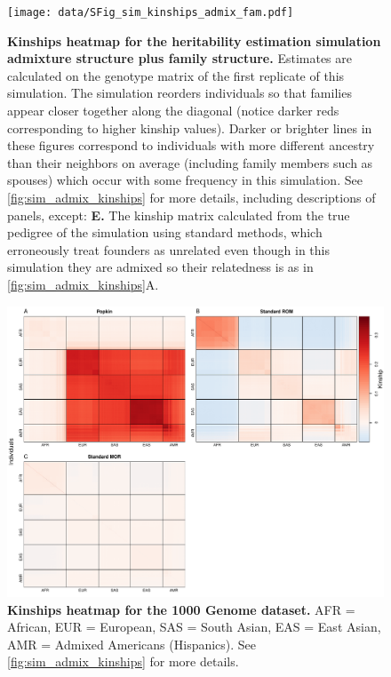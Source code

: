 \documentclass[11pt]{article}
\begin{document}
\begin{figure}[bp!]
  \centering
  \texttt{[image: data/SFig\_sim\_kinships\_admix\_fam.pdf]}
  \caption{
    {\bf Kinships heatmap for the heritability estimation simulation admixture structure plus family structure.}
    Estimates are calculated on the genotype matrix of the first replicate of this simulation.
    The simulation reorders individuals so that families appear closer together along the diagonal (notice darker reds corresponding to higher kinship values).  Darker or brighter lines in these figures correspond to individuals with more different ancestry than their neighbors on average (including family members such as spouses) which occur with some frequency in this simulation.
    See \cref{fig:sim_admix_kinships} for more details, including descriptions of panels, except: \textbf{E.} The kinship matrix calculated from the true pedigree of the simulation using standard methods, which erroneously treat founders as unrelated even though in this simulation they are admixed so their relatedness is as in \cref{fig:sim_admix_kinships}A.
    }
  \label{fig:sim_admix_fam_kinships}
\end{figure}

\begin{figure}[bp!]
  \centering
  \includegraphics[width=\textwidth]{data/SFig_TGP_kinships.pdf}
  \caption{
    {\bf Kinships heatmap for the 1000 Genome dataset.} AFR = African, EUR = European, SAS = South Asian, EAS = East Asian, AMR = Admixed Americans (Hispanics).
    See \cref{fig:sim_admix_kinships} for more details.
    }
  \label{fig:TGP_kinships}
\end{figure}
\end{document}
